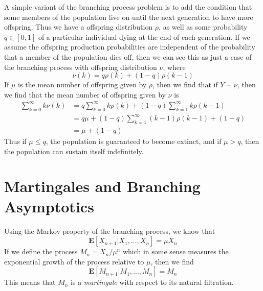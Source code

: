 \begin{example}
    A simple variant of the branching process problem is to add the condition that some members of the population live on until the next generation to have more offspring. Thus we have a offspring distribution $\rho$, as well as some probability $q \in [0,1]$ of a particular individual dying at the end of each generation. If we assume the offspring production probabilities are independent of the probability that a member of the population dies off, then we can see this as just a case of the branching process with offspring distribution $\nu$, where
    \[ \nu(k) = q\rho(k) + (1 - q)\rho(k-1) \]
    If $\mu$ is the mean number of offspring given by $\rho$, then we find that if $Y \sim \nu$, then we find that the mean number of offspring given by $\nu$ is
    \begin{align*}
        \sum_{k = 0}^\infty k \nu(k) &= q \sum_{k = 0}^\infty k \rho(k) + (1 - q) \sum_{k = 1}^\infty k \rho(k-1)\\
        &= q\mu + (1 - q) \sum_{k = 1}^\infty (k-1) \rho(k-1) + (1-q)\\
        &= \mu + (1 - q)
    \end{align*}
    Thus if $\mu \leq q$, the population is guaranteed to become extinct, and if $\mu > q$, then the population can sustain itself indefinitely.
\end{example}

\section{Martingales and Branching Asymptotics}

Using the Markov property of the branching process, we know that
%
\[ \mathbf{E}[X_{n+1}|X_1, \dots, X_n] = \mu X_n \]
%
If we define the process $M_n = X_n/\mu^n$ which in some sense measures the exponential growth of the process relative to $\mu$, then we find
%
\[ \mathbf{E}[M_{n+1}|M_1, \dots, M_n] = M_n \]
%
This means that $M_n$ is a {\it martingale} with respect to its natural filtration.

